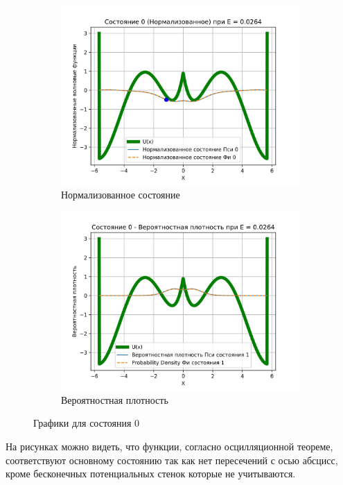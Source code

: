 \documentclass[a4paper,12pt]{article}
\begin{document}
\begin{figure}[H]
    \centering
    \begin{subfigure}{0.45\textwidth}
        \centering
        \includegraphics[width=0.9\linewidth]{Condition_0_(normalized)}
        \caption{Нормализованное состояние}
        \label{fig:norm0}
    \end{subfigure}%
    \begin{subfigure}{0.45\textwidth}
        \centering
        \includegraphics[width=0.9\linewidth]{Condition_0_(Probability_density)}
        \caption{Вероятностная плотность}
        \label{fig:probDens0}
    \end{subfigure}%
\caption{Графики для состояния 0}
\end{figure}
\label{fig:cond0}

На рисунках можно видеть, что функции, согласно осцилляционной теореме, соответствуют основному состоянию так как нет пересечений с осью абсцисс,
кроме бесконечных потенциальных стенок которые не учитываются.
\end{document}
